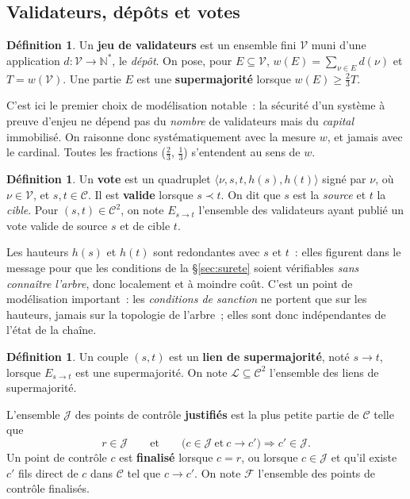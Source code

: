 \documentclass[11pt,a4paper]{article}
\theoremstyle{plain}
\theoremstyle{definition}
\newtheorem{defi}[theoreme]{Définition}
\newcommand{\Cc}{\mathcal{C}}
\newcommand{\Vv}{\mathcal{V}}
\newcommand{\Ll}{\mathcal{L}}
\newcommand{\Jj}{\mathcal{J}}
\newcommand{\Ff}{\mathcal{F}}
\newcommand{\ancs}{\prec}
\begin{document}
\subsection{Validateurs, dépôts et votes}

\begin{defi}
Un \textbf{jeu de validateurs} est un ensemble fini $\Vv$ muni d'une application
$d:\Vv\to\mathbb{N}^{*}$, le \emph{dépôt}. On pose, pour $E\subseteq\Vv$,
$w(E)=\sum_{\nu\in E}d(\nu)$ et $T=w(\Vv)$. Une partie $E$ est une
\textbf{supermajorité} lorsque $w(E)\ge \tfrac{2}{3}T$.
\end{defi}

C'est ici le premier choix de modélisation notable~: la sécurité d'un système à preuve
d'enjeu ne dépend pas du \emph{nombre} de validateurs mais du \emph{capital} immobilisé. On
raisonne donc systématiquement avec la mesure $w$, et jamais avec le cardinal. Toutes les
fractions ($\tfrac23$, $\tfrac13$) s'entendent au sens de $w$.

\begin{defi}
Un \textbf{vote} est un quadruplet $\langle \nu, s, t, h(s), h(t)\rangle$ signé par $\nu$, où
$\nu\in\Vv$, et $s,t\in\Cc$. Il est \textbf{valide} lorsque $s\ancs t$. On dit que $s$ est la
\emph{source} et $t$ la \emph{cible}. Pour $(s,t)\in\Cc^2$, on note $E_{s\to t}$ l'ensemble
des validateurs ayant publié un vote valide de source $s$ et de cible $t$.
\end{defi}

Les hauteurs $h(s)$ et $h(t)$ sont redondantes avec $s$ et $t$~: elles figurent dans le
message pour que les conditions de la §\ref{sec:surete} soient vérifiables \emph{sans
connaître l'arbre}, donc localement et à moindre coût. C'est un point de modélisation
important~: les \emph{conditions de sanction} ne portent que sur les hauteurs, jamais sur la
topologie de l'arbre~; elles sont donc indépendantes de l'état de la chaîne.

\begin{defi}\label{def:noyau}
Un couple $(s,t)$ est un \textbf{lien de supermajorité}, noté $s\to t$, lorsque $E_{s\to t}$
est une supermajorité. On note $\Ll\subseteq\Cc^2$ l'ensemble des liens de supermajorité.

L'ensemble $\Jj$ des points de contrôle \textbf{justifiés} est la plus petite partie de $\Cc$
telle que
\[ r\in\Jj \qquad\text{et}\qquad \big(c\in\Jj \ \text{et}\ c\to c'\big)\Longrightarrow
c'\in\Jj . \]
Un point de contrôle $c$ est \textbf{finalisé} lorsque $c=r$, ou lorsque $c\in\Jj$ et qu'il
existe $c'$ fils direct de $c$ dans $\Cc$ tel que $c\to c'$. On note $\Ff$ l'ensemble des
points de contrôle finalisés.
\end{defi}
\end{document}
